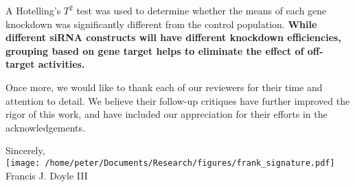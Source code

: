 \documentclass[11pt, letterpaper]{article}
\newenvironment{manuscript}[1]{\begin{center}\begin{tcolorbox}[colback=green!5!white,colframe=green!75!black,width=\textwidth,title={#1},breakable,fonttitle=\bfseries]}{\end{tcolorbox}\end{center}}
\begin{document}
\begin{manuscript}{Page 10}
A Hotelling's $T^2$ test was used to determine whether the means of each gene knockdown was significantly different from the control population.
{\bfseries While different siRNA constructs will have different knockdown efficiencies, grouping based on gene target helps to eliminate the effect of off-target activities.}
\end{manuscript}

\vspace{3ex}

Once more, we would like to thank each of our reviewers for their time and attention to detail.
We believe their follow-up critiques have further improved the rigor of this work, and have included our appreciation for their efforts in the acknowledgements.

\vspace{4ex}
\begin{flushright}
  Sincerely,\\[2ex]

  \texttt{[image: /home/peter/Documents/Research/figures/frank\_signature.pdf]}\\[1ex]
Francis J. Doyle III
\end{flushright}
\end{document}

